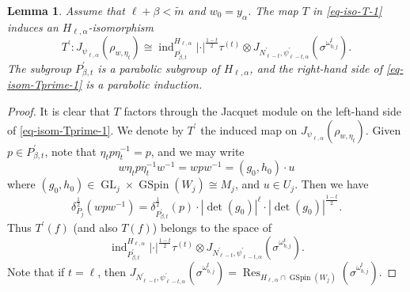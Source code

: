 \documentclass[12pt]{amsart}
\newcommand{\Res}{\operatorname{Res}}
\newcommand{\ind}{\operatorname{ind}}
\newcommand{\wt}{\widetilde}
\newtheorem{lemma}[theorem]{Lemma}
\theoremstyle{remark}
\DeclareMathOperator{\GL}{GL}
\DeclareMathOperator{\GSpin}{GSpin}
\begin{document}
\begin{lemma}
\label{lemma-JacquetModule-lemma1}
Assume that $\ell+\beta<\wt m$ and $w_0=y_\alpha$. 
The map $T$ in \eqref{eq-iso-T-1} induces an $H_{\ell,\alpha}$-isomorphism
\begin{equation}
\label{eq-isom-Tprime-1}
T^\prime: J_{\psi_{\ell,\alpha}}(	\rho_{w,\eta_{t}} )  \cong  \ind_{P^\prime_{\beta,t}}^{H_{\ell,\alpha}} |\cdot|^{\frac{1-t}{2}} \tau^{(t)} \otimes J_{N_{\ell-t}^\prime, \psi_{\ell-t,\alpha} ^\prime}(\sigma^{\omega_{b,j}^t}).
\end{equation}
The subgroup $P^\prime_{\beta,t}$ is a parabolic subgroup of $H_{\ell,\alpha}$, and the right-hand side of \eqref{eq-isom-Tprime-1} is a parabolic induction.
\end{lemma}

\begin{proof}
It is clear that $T$ factors through the Jacquet module on the left-hand side of  \eqref{eq-isom-Tprime-1}. 
We denote by $T^\prime$ the induced map on $J_{\psi_{\ell,\alpha}}(	\rho_{w,\eta_{t}} )$. 
Given $p\in P_{\beta,t}^\prime$, note that $\eta_t p \eta_t^{-1}=p$, and we may write
\begin{equation*}
w \eta_t p \eta_t^{-1} w^{-1} = w p w^{-1}= (g_0, h_0)\cdot u	
\end{equation*}
where $(g_0,h_0)\in \GL_j\times \GSpin(W_j)\cong M_j$, and $u\in U_j$. Then we have
\begin{equation*}
\delta_{P_j}^{\frac{1}{2}}( w p w^{-1})=\delta_{P_{\beta,t}^\prime}^{\frac{1}{2}}(p) \cdot  |\det(g_0)|^\ell \cdot  |\det(g_0)|^{\frac{1-t}{2}}.	
\end{equation*}
Thus $T^\prime(f)$ (and also $T(f)$) belongs to the space of
\begin{equation*}
	\ind_{P^\prime_{\beta,t}}^{H_{\ell,\alpha}} |\cdot|^{\frac{1-t}{2}} \tau^{(t)} \otimes J_{N_{\ell-t}^\prime, \psi_{\ell-t,\alpha} ^\prime}(\sigma^{\omega_{b,j}^t}).
\end{equation*}
Note that if $t=\ell$, then $J_{N_{\ell-t}^\prime, \psi_{\ell-t,\alpha} ^\prime}(\sigma^{\omega_{b,j}^t})=\Res_{H_{\ell,\alpha}\cap \GSpin(W_j)}(\sigma^{\omega_{b,j}^t})$.



\end{proof}
\end{document}
